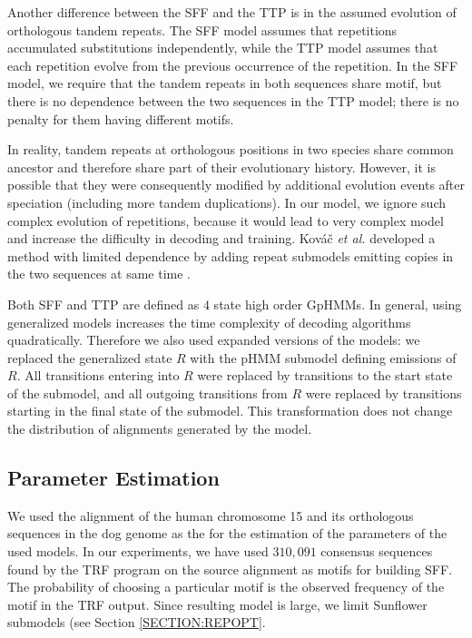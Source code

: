 Another difference between the SFF and the TTP is in the assumed evolution of
orthologous tandem repeats.  The SFF model assumes that repetitions accumulated
substitutions independently, while the TTP model assumes that each repetition
evolve from the previous occurrence of the repetition. In the SFF model, we
require that the tandem repeats in both sequences share motif, but there is no
dependence between the two sequences in the TTP model; there is no penalty for
them having different motifs.

In reality, tandem repeats at orthologous positions in two species share common
ancestor and therefore share part of their evolutionary history. However, it is
possible that they were consequently modified by additional evolution events
after speciation (including more tandem duplications). In our model, we ignore
such complex evolution of repetitions, because it would lead to very complex
model and increase the difficulty in decoding and training. Kováč {\it et al.}
developed a method with limited dependence by adding repeat submodels emitting
copies in the two sequences at same time \cite{Kovac2012}.

Both SFF and TTP are defined as $4$ state high order GpHMMs.  In general, using
generalized models increases the time complexity of decoding algorithms
quadratically. Therefore we also used expanded versions of the models: we
replaced the generalized state $R$ with the pHMM submodel defining emissions of
$R$. All transitions entering into $R$ were replaced by transitions to the
start state of the submodel, and all outgoing transitions from $R$ were
replaced by transitions starting in the final state of the submodel. This
transformation does not change the distribution of alignments generated by the
model.  

\subsection{Parameter Estimation}\label{SECTION:ALNPAREST}
We used the alignment of the human chromosome 15 and its orthologous sequences
in the dog genome as the  for the estimation of
the parameters of the used models.
In our experiments, we have used $310,091$ consensus sequences found by the TRF
program on the source alignment as motifs for building SFF.  The probability of choosing a particular
motif is the observed frequency of the motif in the TRF output. Since resulting
model is large, we limit Sunflower submodels (see Section \ref{SECTION:REPOPT}.

